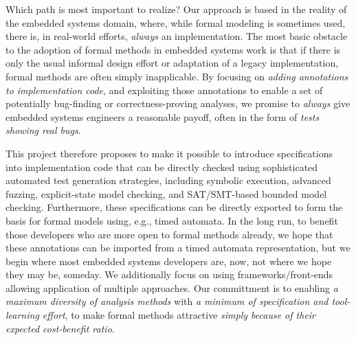 Which path is most important to realize?  Our approach is based in the reality of the embedded systems domain, where, while formal modeling is sometimes used, there is, in real-world efforts, \emph{always} an implementation.  The most basic obstacle to the adoption of formal methods in embedded systems work is that if there is only the usual informal design effort or adaptation of a legacy implementation, formal methods are often simply inapplicable.  By focusing on \emph{adding annotations to implementation code}, and exploiting those annotations to enable a set of potentially bug-finding or correctness-proving analyses, we promise to \emph{always} give embedded systems engineers a reasonable payoff, often in the form of \emph{tests showing real bugs}.

This project therefore proposes to make it possible to introduce specifications into implementation code that can be directly checked using sophisticated automated test generation strategies, including symbolic execution, advanced fuzzing, explicit-state model checking, and SAT/SMT-based bounded model checking.   Furthermore, these specifications can be directly exported to form the basis for formal models using, e.g., timed automata.  In the long run, to benefit those developers who are more open to formal methods already, we hope that these annotations can be imported from a timed automata representation, but we begin where most embedded systems developers are, now, not where we hope they may be, someday.
We additionally focus on using frameworks/front-ends allowing application of multiple approaches.  Our committment is to enabling \emph{a maximum diversity of analysis methods} with \emph{a minimum of specification and tool-learning effort}, to make formal methods attractive \emph{simply because of their expected cost-benefit ratio}.

